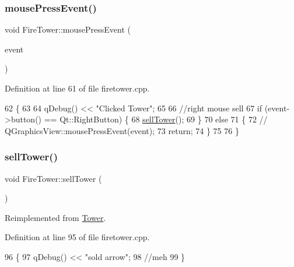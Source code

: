 \subsubsection{\texorpdfstring{mouse\+Press\+Event()}{mousePressEvent()}}
{\footnotesize\ttfamily void Fire\+Tower\+::mouse\+Press\+Event (\begin{DoxyParamCaption}\item[{Q\+Graphics\+Scene\+Mouse\+Event $\ast$}]{event }\end{DoxyParamCaption})}



Definition at line 61 of file firetower.\+cpp.


\begin{DoxyCode}
62 \{
63 
64    qDebug() << \textcolor{stringliteral}{"Clicked Tower"};
65 
66    \textcolor{comment}{//right mouse sell}
67     \textcolor{keywordflow}{if} (event->button() == Qt::RightButton) \{
68         \hyperlink{class_fire_tower_adc1bcb15312eac1dd9788be48e55baad}{sellTower}();
69     \}
70     \textcolor{keywordflow}{else}
71     \{
72         \textcolor{comment}{//        QGraphicsView::mousePressEvent(event);}
73         \textcolor{keywordflow}{return};
74     \}
75 
76 \}
\end{DoxyCode}
\mbox{\label{class_fire_tower_adc1bcb15312eac1dd9788be48e55baad}} 
\subsubsection{\texorpdfstring{sell\+Tower()}{sellTower()}}
{\footnotesize\ttfamily void Fire\+Tower\+::sell\+Tower (\begin{DoxyParamCaption}{ }\end{DoxyParamCaption})\hspace{0.3cm}{\ttfamily [virtual]}}



Reimplemented from \hyperlink{class_tower_a7736b1132e64e14a977e9e8c91c3338f}{Tower}.



Definition at line 95 of file firetower.\+cpp.


\begin{DoxyCode}
96 \{
97     qDebug() << \textcolor{stringliteral}{"sold arrow"};
98     \textcolor{comment}{//meh}
99 \}
\end{DoxyCode}


